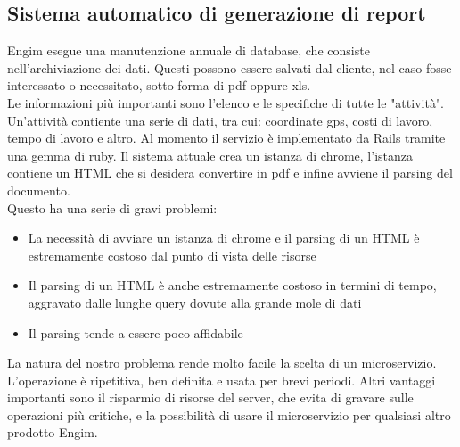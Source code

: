 \documentclass[12pt]{article}
\begin{document}
\subsection{Sistema automatico di generazione di report}
Engim esegue una manutenzione annuale di database, che consiste nell'archiviazione
dei dati. Questi possono essere salvati dal cliente, nel caso fosse interessato 
o necessitato, sotto forma di pdf oppure xls.
\\ 
Le informazioni più importanti sono l'elenco e le specifiche di tutte le "attività". 
Un'attività contiente una serie di dati, tra cui: coordinate
gps, costi di lavoro, tempo di lavoro e altro.  
Al momento il servizio è implementato da Rails tramite una gemma di ruby. 
Il sistema attuale crea un istanza di chrome, l'istanza contiene un HTML
che si desidera convertire in pdf e infine avviene il parsing del documento.
\\ Questo ha una serie di gravi problemi:
\begin{itemize}
  \item La necessità di avviare un istanza di chrome e il parsing di un HTML è
  estremamente costoso dal punto di vista delle risorse
  \item Il parsing di un HTML è anche estremamente costoso in termini di tempo,
  aggravato dalle lunghe query dovute alla grande mole di dati 
  \item Il  parsing tende a essere poco affidabile
\end{itemize}
La natura del nostro problema rende molto facile la scelta di un microservizio.
L'operazione è ripetitiva, ben definita e usata per brevi periodi. Altri vantaggi 
importanti sono il risparmio di risorse del server, che evita di gravare sulle 
operazioni più critiche, e la possibilità di usare il microservizio per qualsiasi 
altro prodotto Engim.
\end{document}
